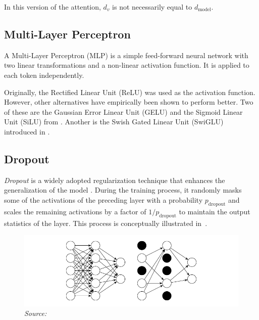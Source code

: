 In this version of the attention, \(d_v\) is not necessarily equal to \(d_{\mathrm{model}}\).

\subsection{Multi-Layer Perceptron}

A Multi-Layer Perceptron (MLP) is a simple feed-forward neural network with two linear transformations and a non-linear activation function. It is applied to each token independently.

Originally, the Rectified Linear Unit (ReLU) was used as the activation function. However, other alternatives have empirically been shown to perform better. Two of these are the Gaussian Error Linear Unit (GELU) and the Sigmoid Linear Unit (SiLU) from \citet{hendrycks2016}. Another is the Swish Gated Linear Unit (SwiGLU) introduced in \citet{shazeer2020}.

\subsection{Dropout}

\textit{Dropout} is a widely adopted regularization technique that enhances the generalization of the model \parencite{srivastava2014}. During the training process, it randomly masks some of the activations of the preceding layer with a probability \(p_{\mathrm{dropout}}\) and scales the remaining activations by a factor of \(1 / p_{\mathrm{dropout}}\) to maintain the output statistics of the layer. This process is conceptually illustrated in~.

\begin{figure}[ht]
    \centering
    \includegraphics[width=\textwidth]{figures/dropout.pdf}
    \label{fig:dropout}
    \hfill\textit{Source: \citet{labach2019}}
\end{figure}

